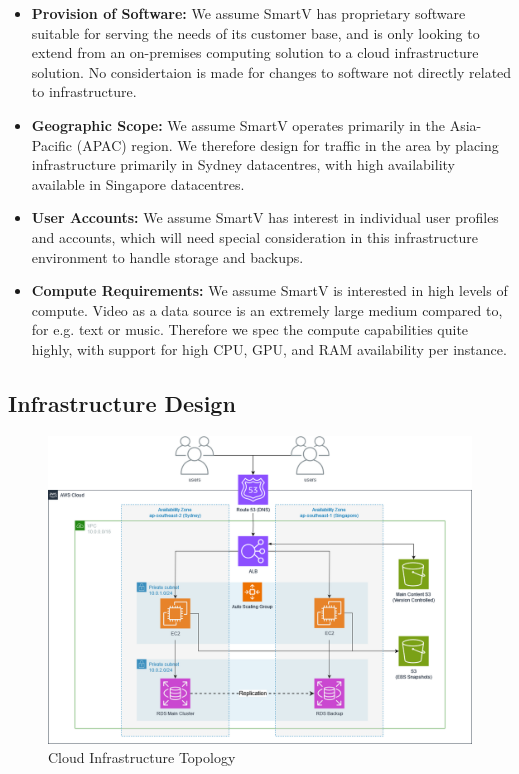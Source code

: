\begin{itemize}
    \item \textbf{Provision of Software:} We assume SmartV has proprietary software suitable for serving the needs of its customer base, and is only looking to extend from an on-premises computing solution to a cloud infrastructure solution. No considertaion is made for changes to software not directly related to infrastructure.
    \item \textbf{Geographic Scope:} We assume SmartV operates primarily in the Asia-Pacific (APAC) region. We therefore design for traffic in the area by placing infrastructure primarily in Sydney datacentres, with high availability available in Singapore datacentres.
    \item \textbf{User Accounts:} We assume SmartV has interest in individual user profiles and accounts, which will need special consideration in this infrastructure environment to handle storage and backups.
    \item \textbf{Compute Requirements:} We assume SmartV is interested in high levels of compute. Video as a data source is an extremely large medium compared to, for e.g. text or music. Therefore we spec the compute capabilities quite highly, with support for high CPU, GPU, and RAM availability per instance.
\end{itemize}

\subsection{Infrastructure Design}

\begin{figure}[H]\label{fig:awsdiagram}
    \centering
    \includegraphics[width=\textwidth]{cci_aws}
    \caption{Cloud Infrastructure Topology}
\end{figure}

